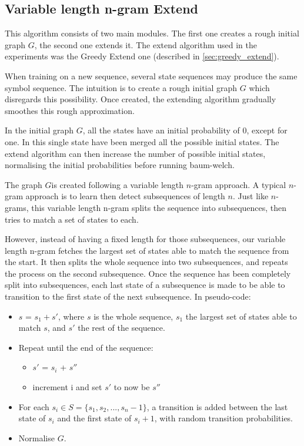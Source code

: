\subsection{Variable length n-gram Extend}
\label{sec:vl-ngram-extend}
This algorithm consists of two main modules. The first one creates a rough initial graph $G$, the second one extends it. The extend algorithm used in the experiments was the Greedy Extend one (described in \ref{sec:greedy_extend}).

When training on a new sequence, several state sequences may produce the same symbol sequence. The intuition is to create a rough initial graph $G$ which disregards this possibility. Once created, the extending algorithm gradually smoothes this rough approximation.

In the initial graph $G$, all the states have an initial probability of 0, except for one. In this single state have been merged all the possible initial states. The extend algorithm can then increase the number of possible initial states, normalising the initial probabilities before running \gls{baum-welch}.

The graph $G$is created following a variable length $n$-gram approach. A typical $n$-gram approach is to learn then detect subsequences of length $n$. Just like $n$-grams, this variable length n-gram splits the sequence into subsequences, then tries to match a set of states to each.

However, instead of having a fixed length for those subsequences, our variable length n-gram fetches the largest set of states able to match the sequence from the start. It then splits the whole sequence into two subsequences, and repeats the process on the second subsequence. Once the sequence has been completely split into subsequences, each last state of a subsequence is made to be able to transition to the first state of the next subsequence. In pseudo-code:

\begin{itemize}
	\item $s$ = $s_1 + s'$, where $s$ is the whole sequence, $s_1$ the largest set of states able to match $s$, and $s'$ the rest of the sequence.
	\item Repeat until the end of the sequence:
	\begin{itemize}
		\item $s'$ = $s_i$ + $s''$
		\item increment i and set $s'$ to now be $s''$
	\end{itemize}
	\item For each $s_i \in S = \{s_1, s_2, ... , s_n-1\}$, a transition is added between the last state of $s_i$ and the first state of $s_i+1$, with random transition probabilities.
	\item Normalise $G$.
\end{itemize}

